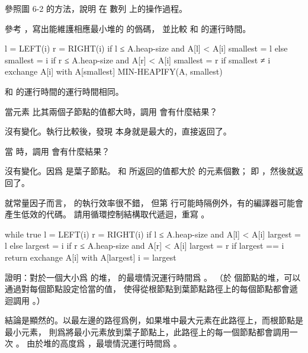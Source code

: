 \startsection[
  title={Maintaining the heap property},
]

\startEXERCISE
參照圖 6-2 的方法，說明  在
數列  上的操作過程。
\stopEXERCISE

\startANSWER
\startcombination[2*2]
{\externalfigure[output/e6_2_1-1]}{}
{\externalfigure[output/e6_2_1-2]}{}
{\externalfigure[output/e6_2_1-3]}{}
{}{}
\stopcombination
\stopANSWER

\startEXERCISE
參考 ，寫出能維護相應最小堆的  的僞碼，
並比較  和  的運行時間。
\stopEXERCISE

\startANSWER
{}
\startCLRS
l = LEFT(i)
r = RIGHT(i)
if l ≤ A.heap-size and A[l] < A[i]
	smallest = l
else
	smallest = i
if r ≤ A.heap-size and A[r] < A[i]
	smallest = r
if smallest ≠ i
	exchange A[i] with A[smallest]
	MIN-HEAPIFY(A, smallest)
\stopCLRS

 和  的運行時間的運行時間相同。
\stopANSWER

\startEXERCISE
當元素  比其兩個子節點的值都大時，調用  會有什麼結果？
\stopEXERCISE

\startANSWER
沒有變化。執行比較後，發現  本身就是最大的，直接返回了。
\stopANSWER

\startEXERCISE
當  時，調用  會有什麼結果？
\stopEXERCISE

\startANSWER
沒有變化。因爲  是葉子節點。  和  所返回的值都大於  的元素個數；
  即 ，然後就返回了。
\stopANSWER

\startEXERCISE
就常量因子而言，  的執行效率很不錯，
但第  行可能時隔例外，有的編譯器可能會產生低效的代碼。
請用循環控制結構取代遞迴，重寫 。
\stopEXERCISE

\startANSWER
{}
\startCLRS
while true
	l = LEFT(i)
	r = RIGHT(i)
	if l ≤ A.heap-size and A[l] < A[i]
		largest = l
	else
		largest = i
	if r ≤ A.heap-size and A[r] < A[i]
		largest = r
	if largest == i
		return
	exchange A[i] with A[largest]
	i = largest
\stopCLRS
\stopANSWER

\blank

\startEXERCISE
證明：對於一個大小爲  的堆，  的最壞情況運行時間爲 。
（\hint 於  個節點的堆，可以通過對每個節點設定恰當的值，
使得從根節點到葉節點路徑上的每個節點都會遞迴調用 。）
\stopEXERCISE

\startANSWER
結論是顯然的。以最左邊的路徑爲例，如果堆中最大元素在此路徑上，而根節點是最小元素，
則爲將最小元素放到葉子節點上，此路徑上的每一個節點都會調用一次 。
由於堆的高度爲  ，最壞情況運行時間爲 。
\stopANSWER

\stopsection
